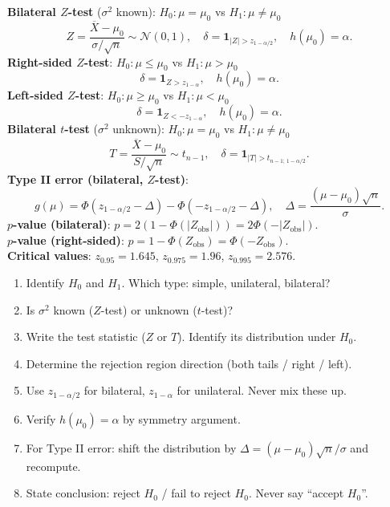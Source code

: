 \documentclass[11pt,a4paper]{article}
\begin{document}
\begin{tcolorbox}[formulabox]
\textbf{Bilateral $Z$-test} ($\sigma^2$ known): $H_0:\mu=\mu_0$ vs $H_1:\mu\neq\mu_0$
\[
  Z=\frac{\overline{X}-\mu_0}{\sigma/\sqrt{n}}\sim\mathcal{N}(0,1),\quad \delta=\mathbf{1}_{|Z|>z_{1-\alpha/2}},\quad h(\mu_0)=\alpha.
\]
\textbf{Right-sided $Z$-test}: $H_0:\mu\leq\mu_0$ vs $H_1:\mu>\mu_0$
\[
  \delta=\mathbf{1}_{Z>z_{1-\alpha}},\quad h(\mu_0)=\alpha.
\]
\textbf{Left-sided $Z$-test}: $H_0:\mu\geq\mu_0$ vs $H_1:\mu<\mu_0$
\[
  \delta=\mathbf{1}_{Z<-z_{1-\alpha}},\quad h(\mu_0)=\alpha.
\]
\textbf{Bilateral $t$-test} ($\sigma^2$ unknown): $H_0:\mu=\mu_0$ vs $H_1:\mu\neq\mu_0$
\[
  T=\frac{\overline{X}-\mu_0}{S/\sqrt{n}}\sim t_{n-1},\quad \delta=\mathbf{1}_{|T|>t_{n-1;\,1-\alpha/2}}.
\]
\textbf{Type II error (bilateral, $Z$-test)}:
\[
  g(\mu)=\Phi\!\left(z_{1-\alpha/2}-\Delta\right)-\Phi\!\left(-z_{1-\alpha/2}-\Delta\right),\quad \Delta=\frac{(\mu-\mu_0)\sqrt{n}}{\sigma}.
\]
\textbf{$p$-value (bilateral)}: $p=2(1-\Phi(|Z_{\text{obs}}|))=2\Phi(-|Z_{\text{obs}}|)$.\\
\textbf{$p$-value (right-sided)}: $p=1-\Phi(Z_{\text{obs}})=\Phi(-Z_{\text{obs}})$.\\
\textbf{Critical values}: $z_{0.95}=1.645$, $z_{0.975}=1.96$, $z_{0.995}=2.576$.
\end{tcolorbox}

\begin{tcolorbox}[successbox, title={Exam checklist for hypothesis testing problems}]
\begin{enumerate}[leftmargin=2em,itemsep=2pt]
  \item[$\square$] Identify $H_0$ and $H_1$. Which type: simple, unilateral, bilateral?
  \item[$\square$] Is $\sigma^2$ known ($Z$-test) or unknown ($t$-test)?
  \item[$\square$] Write the test statistic ($Z$ or $T$). Identify its distribution under $H_0$.
  \item[$\square$] Determine the rejection region direction (both tails / right / left).
  \item[$\square$] Use $z_{1-\alpha/2}$ for bilateral, $z_{1-\alpha}$ for unilateral. Never mix these up.
  \item[$\square$] Verify $h(\mu_0)=\alpha$ by symmetry argument.
  \item[$\square$] For Type II error: shift the distribution by $\Delta=(\mu-\mu_0)\sqrt{n}/\sigma$ and recompute.
  \item[$\square$] State conclusion: reject $H_0$ / fail to reject $H_0$. Never say ``accept $H_0$''.
\end{enumerate}
\end{tcolorbox}
\end{document}
